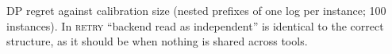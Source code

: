 \begin{table}[!htbp]
\centering\scriptsize\setlength{\tabcolsep}{3pt}
\caption{DP regret against calibration size (nested prefixes of one log per instance; 100 instances). In \textsc{retry} ``backend read as independent'' is identical to the correct structure, as it should be when nothing is shared across tools.}
\label{tab:app-x3}
\resizebox{\linewidth}{!}{}
\end{table}
